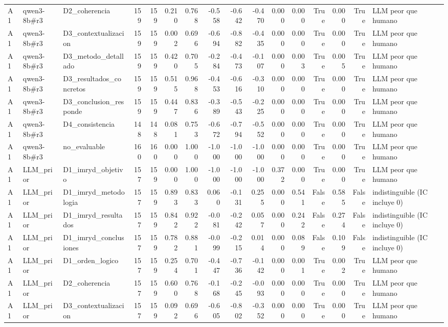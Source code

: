 \begin{table}
{\begin{tabular}{lllrrrrrrrrrrrrl}
A1 & qwen3-8b\#r3 & D2\_coherencia & 159 & 159 & 0.210 & 0.768 & -0.558 & -0.642 & -0.470 & 0.000 & 0.000 & True & 0.000 & True & LLM peor que humano \\
A1 & qwen3-8b\#r3 & D3\_contextualizacion & 159 & 159 & 0.002 & 0.696 & -0.694 & -0.882 & -0.435 & 0.000 & 0.000 & True & 0.000 & True & LLM peor que humano \\
A1 & qwen3-8b\#r3 & D3\_metodo\_detallado & 159 & 159 & 0.420 & 0.705 & -0.284 & -0.473 & -0.107 & 0.000 & 0.003 & True & 0.005 & True & LLM peor que humano \\
A1 & qwen3-8b\#r3 & D3\_resultados\_concretos & 159 & 159 & 0.515 & 0.968 & -0.453 & -0.616 & -0.310 & 0.000 & 0.000 & True & 0.000 & True & LLM peor que humano \\
A1 & qwen3-8b\#r3 & D3\_conclusion\_responde & 159 & 159 & 0.447 & 0.836 & -0.389 & -0.543 & -0.225 & 0.000 & 0.000 & True & 0.000 & True & LLM peor que humano \\
A1 & qwen3-8b\#r3 & D4\_consistencia & 148 & 148 & 0.081 & 0.753 & -0.672 & -0.794 & -0.552 & 0.000 & 0.000 & True & 0.000 & True & LLM peor que humano \\
A1 & qwen3-8b\#r3 & no\_evaluable & 160 & 160 & 0.000 & 1.000 & -1.000 & -1.000 & -1.000 & 0.000 & 0.000 & True & 0.000 & True & LLM peor que humano \\
A1 & LLM\_prior & D1\_imryd\_objetivo & 157 & 159 & 0.000 & 1.000 & -1.000 & -1.000 & -1.000 & 0.372 & 0.000 & True & 0.000 & True & LLM peor que humano \\
A1 & LLM\_prior & D1\_imryd\_metodologia & 157 & 159 & 0.893 & 0.833 & 0.060 & -0.131 & 0.255 & 0.000 & 0.541 & False & 0.585 & False & indistinguible (IC incluye 0) \\
A1 & LLM\_prior & D1\_imryd\_resultados & 157 & 159 & 0.842 & 0.922 & -0.081 & -0.242 & 0.057 & 0.000 & 0.242 & False & 0.274 & False & indistinguible (IC incluye 0) \\
A1 & LLM\_prior & D1\_imryd\_conclusiones & 157 & 159 & 0.782 & 0.881 & -0.099 & -0.215 & 0.014 & 0.000 & 0.089 & False & 0.109 & False & indistinguible (IC incluye 0) \\
A1 & LLM\_prior & D1\_orden\_logico & 157 & 159 & 0.254 & 0.701 & -0.447 & -0.736 & -0.142 & 0.000 & 0.001 & True & 0.002 & True & LLM peor que humano \\
A1 & LLM\_prior & D2\_coherencia & 157 & 159 & 0.600 & 0.768 & -0.168 & -0.245 & -0.093 & 0.000 & 0.000 & True & 0.000 & True & LLM peor que humano \\
A1 & LLM\_prior & D3\_contextualizacion & 157 & 159 & 0.092 & 0.696 & -0.605 & -0.802 & -0.352 & 0.000 & 0.000 & True & 0.000 & True & LLM peor que humano \\

\end{tabular}}
\end{table}
